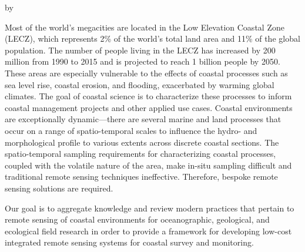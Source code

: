 \documentclass{article}
\begin{document}

\newpage
{}
\thispagestyle{fancy}
\begin{center}
\vspace{1cm}
\par{\thetitle}
\vspace{1cm}
\par{by}
\vspace{1cm}
\par{\theauthor}
\vspace{1cm}
\end{center}
\doublespacing

\par{Most of the world’s megacities are located in the Low Elevation Coastal Zone (LECZ), which represents 2\% of the world’s total land area and 11\% of the global population. The number of people living in the LECZ has increased by 200 million from 1990 to 2015 and is projected to reach 1 billion people by 2050. These areas are especially vulnerable to the effects of coastal processes such as sea level rise, coastal erosion, and flooding, exacerbated by warming global climates. The goal of coastal science is to characterize these processes to inform coastal management projects and other applied use cases. Coastal environments are exceptionally dynamic---there are several marine and land processes that occur on a range of spatio-temporal scales to influence the hydro- and morphological profile to various extents across discrete coastal sections. The spatio-temporal sampling requirements for characterizing coastal processes, coupled with the volatile nature of the area, make in-situ sampling difficult and traditional remote sensing techniques ineffective. Therefore, bespoke remote sensing solutions are required.}

\par{Our goal is to aggregate knowledge and review modern practices that pertain to remote sensing of coastal environments for oceanographic, geological, and ecological field research in order to provide a framework for developing low-cost integrated remote sensing systems for coastal survey and monitoring.}
\end{document}
